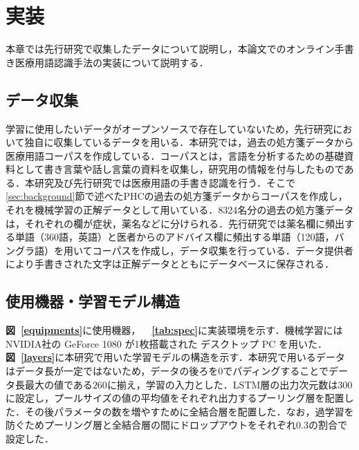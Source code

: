 
\chapter{実装}
\label{cha:imple}
本章では先行研究で収集したデータについて説明し，本論文でのオンライン手書き医療用語認識手法の実装について説明する．
\section{データ収集}
\label{sec:collection}
学習に使用したいデータがオープンソースで存在していないため，先行研究\cite{takahashi}において独自に収集しているデータを用いる．本研究では，過去の処方箋データから医療用語コーパスを作成している．コーパスとは，言語を分析するための基礎資料として書き言葉や話し言葉の資料を収集し，研究用の情報を付与したものである．本研究及び先行研究では医療用語の手書き認識を行う．そこで \ref{sec:background}節で述べたPHCの過去の処方箋データからコーパスを作成し，それを機械学習の正解データとして用いている．8324名分の過去の処方箋データは，それぞれの欄が症状，薬名などに分けられる．先行研究では薬名欄に頻出する単語（360語，英語）と医者からのアドバイス欄に頻出する単語（120語，バングラ語）を用いてコーパスを作成し，データ収集を行っている．データ提供者により手書きされた文字は正解データとともにデータベースに保存される．
%

\section{使用機器・学習モデル構造}
\textbf{図~\ref{equipments}}に使用機器，\textbf{~\tablename~\ref{tab:spec}}に実装環境を示す．機械学習には NVIDIA社の GeForce 1080 が1枚搭載された デスクトップ PC を用いた．\textbf{図~\ref{layers}}に本研究で用いた学習モデルの構造を示す．本研究で用いるデータはデータ長が一定ではないため，データの後ろを$0$でパディングすることでデータ長最大の値である$260$に揃え，学習の入力とした．LSTM層の出力次元数は$300$に設定し，プールサイズの値の平均値をそれぞれ出力するプーリング層を配置した．その後パラメータの数を増やすために全結合層を配置した．なお，過学習を防ぐためプーリング層と全結合層の間にドロップアウト\cite{dropout}をそれぞれ$0.3$の割合で設定した．

